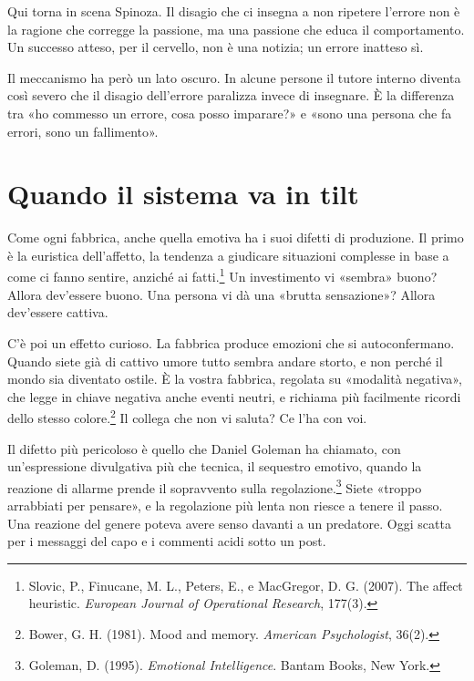 Qui torna in scena Spinoza. Il disagio che ci insegna a non ripetere l'errore non è la ragione che corregge la passione, ma una passione che educa il comportamento. Un successo atteso, per il cervello, non è una notizia; un errore inatteso sì.

Il meccanismo ha però un lato oscuro. In alcune persone il tutore interno diventa così severo che il disagio dell'errore paralizza invece di insegnare. È la differenza tra «ho commesso un errore, cosa posso imparare?» e «sono una persona che fa errori, sono un fallimento».

\section{Quando il sistema va in tilt}

Come ogni fabbrica, anche quella emotiva ha i suoi difetti di produzione. Il primo è la euristica dell'affetto, la tendenza a giudicare situazioni complesse in base a come ci fanno sentire, anziché ai fatti.\footnote{Slovic, P., Finucane, M. L., Peters, E., e MacGregor, D. G. (2007). The affect heuristic. \textit{European Journal of Operational Research}, 177(3).} Un investimento vi «sembra» buono? Allora dev'essere buono. Una persona vi dà una «brutta sensazione»? Allora dev'essere cattiva.

C'è poi un effetto curioso. La fabbrica produce emozioni che si autoconfermano. Quando siete già di cattivo umore tutto sembra andare storto, e non perché il mondo sia diventato ostile. È la vostra fabbrica, regolata su «modalità negativa», che legge in chiave negativa anche eventi neutri, e richiama più facilmente ricordi dello stesso colore.\footnote{Bower, G. H. (1981). Mood and memory. \textit{American Psychologist}, 36(2).} Il collega che non vi saluta? Ce l'ha con voi.

Il difetto più pericoloso è quello che Daniel Goleman ha chiamato, con un'espressione divulgativa più che tecnica, il sequestro emotivo, quando la reazione di allarme prende il sopravvento sulla regolazione.\footnote{Goleman, D. (1995). \textit{Emotional Intelligence}. Bantam Books, New York.} Siete «troppo arrabbiati per pensare», e la regolazione più lenta non riesce a tenere il passo. Una reazione del genere poteva avere senso davanti a un predatore. Oggi scatta per i messaggi del capo e i commenti acidi sotto un post.


